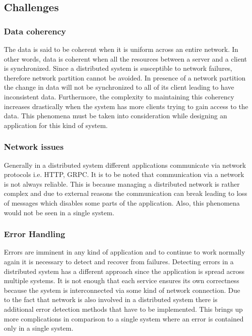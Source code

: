    \subsection{Challenges}    
        \label{subsection: distriChallenges}
        \subsubsection{Data coherency}
        The data is said to be coherent when it is uniform across an entire network. In other words, data is coherent when all
        the resources between a server and a client is synchronized. 
        Since a distributed system is susceptible to network failures, therefore network partition \cite[p.~59]{CAP} cannot be avoided. In presence
        of a network partition the change in data will not be synchronized to all of its client leading to have inconsistent data. Furthermore, the
        complexity to maintaining this coherency increases drastically when the system has more clients trying to gain access to the data. This phenomena
        must be taken into consideration while designing an application for this kind of system.

        \subsubsection{Network issues}
        Generally in a distributed system different applications communicate via network protocols i.e. HTTP, GRPC. It is to be noted that
        communication via a network is not always reliable. This is because managing a distributed network is rather complex and due to
        external reasons the communication can break leading to loss of messages which disables some parts of the application. 
        Also, this phenomena would not be seen in a single system.

        \subsubsection{Error Handling}
        Errors are imminent in any kind of application and to continue to work normally again it is necessary to detect and recover from failures.
        Detecting errors in a distributed system has a different approach since the application is spread across multiple systems. 
        It is not enough that each service ensures its own correctness because the system is interconnected via some kind of
        network connection. Due to the fact that network is also involved in a distributed system there is additional error detection methods that have
        to be implemented. This brings up more complications in comparison to a single system where an error is contained only in a single system.

         
